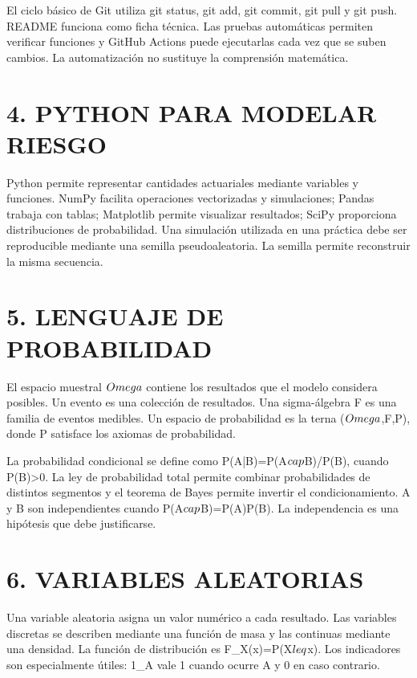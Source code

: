 \documentclass[11pt]{article}
\begin{document}
El ciclo básico de Git utiliza git status, git add, git commit, git pull y git push. README funciona como ficha técnica. Las pruebas automáticas permiten verificar funciones y GitHub Actions puede ejecutarlas cada vez que se suben cambios. La automatización no sustituye la comprensión matemática.

\section*{4. PYTHON PARA MODELAR RIESGO}

Python permite representar cantidades actuariales mediante variables y funciones. NumPy facilita operaciones vectorizadas y simulaciones; Pandas trabaja con tablas; Matplotlib permite visualizar resultados; SciPy proporciona distribuciones de probabilidad. Una simulación utilizada en una práctica debe ser reproducible mediante una semilla pseudoaleatoria. La semilla permite reconstruir la misma secuencia.

\section*{5. LENGUAJE DE PROBABILIDAD}

El espacio muestral $\\Omega$ contiene los resultados que el modelo considera posibles. Un evento es una colección de resultados. Una sigma-álgebra F es una familia de eventos medibles. Un espacio de probabilidad es la terna ($\\Omega$,F,P), donde P satisface los axiomas de probabilidad.

La probabilidad condicional se define como P(A|B)=P(A$\\cap$B)/P(B), cuando P(B)>0. La ley de probabilidad total permite combinar probabilidades de distintos segmentos y el teorema de Bayes permite invertir el condicionamiento. A y B son independientes cuando P(A$\\cap$B)=P(A)P(B). La independencia es una hipótesis que debe justificarse.

\section*{6. VARIABLES ALEATORIAS}

Una variable aleatoria asigna un valor numérico a cada resultado. Las variables discretas se describen mediante una función de masa y las continuas mediante una densidad. La función de distribución es F\_X(x)=P(X$\\leq$x). Los indicadores son especialmente útiles: 1\_A vale 1 cuando ocurre A y 0 en caso contrario.
\end{document}
